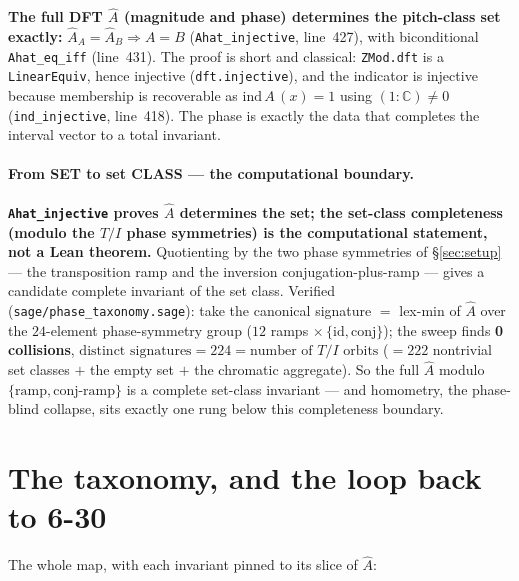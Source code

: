 \documentclass[11pt]{article}
\newcommand{\lean}[1]{\texttt{#1}}
\newcommand{\Ahat}{\hat{A}}
\begin{document}
\textbf{The full DFT $\Ahat$ (magnitude and phase) determines the pitch-class set exactly:}
$\Ahat_A=\Ahat_B\Rightarrow A=B$
(\lean{Ahat\_injective}, line~427), with biconditional \lean{Ahat\_eq\_iff} (line~431). The proof is short
and classical: \lean{ZMod.dft} is a \lean{LinearEquiv}, hence injective (\lean{dft.injective}), and the
indicator is injective because membership is recoverable as $\mathrm{ind}\,A\,(x)=1$ using $(1:\mathbb{C})
\ne0$ (\lean{ind\_injective}, line~418). The phase is exactly the data that completes the interval vector
to a total invariant.

\paragraph{From SET to set CLASS --- the computational boundary.} \textbf{\lean{Ahat\_injective} proves
$\Ahat$ determines the set; the set-class completeness (modulo the $T/I$ phase symmetries) is the
computational statement, not a Lean theorem.} Quotienting by the two phase symmetries of \S\ref{sec:setup}
--- the transposition ramp and the inversion conjugation-plus-ramp --- gives a candidate complete invariant
of the set class.
Verified (\lean{sage/phase\_taxonomy.sage}): take the canonical signature $=$ lex-min of $\Ahat$ over the
$24$-element phase-symmetry group ($12$ ramps $\times\,\{\mathrm{id},\mathrm{conj}\}$); the sweep finds
\textbf{0 collisions}, $\text{distinct signatures}=224=\text{number of }T/I\text{ orbits}$ ($=222$
nontrivial set classes $+$ the empty set $+$ the chromatic aggregate). So the full $\Ahat$ modulo
$\{\text{ramp},\text{conj-ramp}\}$ is a complete set-class invariant --- and homometry, the phase-blind
collapse, sits exactly one rung below this completeness boundary.

\section{The taxonomy, and the loop back to 6-30}\label{sec:taxonomy}

The whole map, with each invariant pinned to its slice of $\Ahat$:
\end{document}
